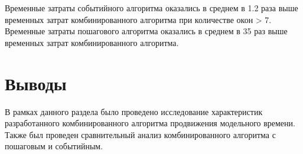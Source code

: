 Временные затраты событийного алгоритма оказались в среднем в 1.2 раза выше временных затрат комбинированного алгоритма при количестве окон > 7.
Временные затраты пошагового алгоритма оказались в среднем в 35 раз выше временных затрат комбинированного алгоритма.

\section{Выводы}
В рамках данного раздела было проведено исследование характеристик разработанного комбинированного алгоритма продвижения модельного времени. Также был проведен сравнительный анализ комбинированного алгоритма с пошаговым и событийным.